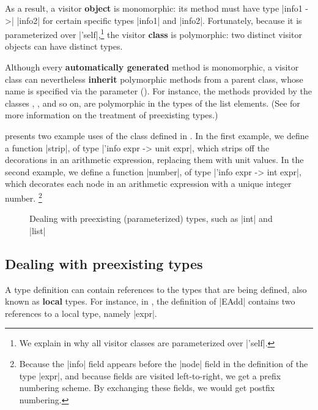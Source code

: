 \documentclass[11pt,a4paper,twoside]{article}
\renewcommand{\emph}[1]{\textbf{#1}}
\begin{document}
As a result, a visitor \emph{object} is monomorphic: its method
 must have type \oc|info1 ->| \oc|info2| for certain
specific types \oc|info1| and \oc|info2|. Fortunately, because it is
parameterized over \oc|'self|,\footnote{We explain in  why
  all visitor classes are parameterized over \oc|'self|.} the visitor
\emph{class} is polymorphic: two distinct visitor objects can have distinct
types.

Although every \emph{automatically generated} method
is monomorphic, a visitor class can nevertheless \emph{inherit} polymorphic
methods from a parent class, whose name is specified via the \ancestors parameter
(). For instance, the  methods provided by
the classes , , and so on, are
polymorphic in the types of the list elements. (See 
for more information on the treatment of preexisting types.)

 presents two example uses of the class \map defined in
. In the first example, we define a function \oc|strip|, of
type \oc|'info expr -> unit expr|, which strips off the decorations in an
arithmetic expression, replacing them with unit values. In the second example,
we define a function \oc|number|, of type \oc|'info expr -> int expr|, which
decorates each node in an arithmetic expression with a unique integer number.%
\footnote{Because the \oc|info| field appears before the \oc|node| field in
  the definition of the type \oc|expr|, and because fields are visited
  left-to-right, we get a prefix numbering scheme. By exchanging these fields,
  we would get postfix numbering.} %


\begin{figure}[t]
\vspace{-\baselineskip}
\caption{Dealing with preexisting (parameterized) types, such as \oc|int| and \oc|list|}
\label{fig:expr11}
\end{figure}

\subsection{Dealing with preexisting types}
\label{sec:intro:nonlocal}

A type definition can contain references to the types that are being defined,
also known as \emph{local} types. For instance, in , the
definition of \oc|EAdd| contains two references to a local type, namely
\oc|expr|.
\end{document}
